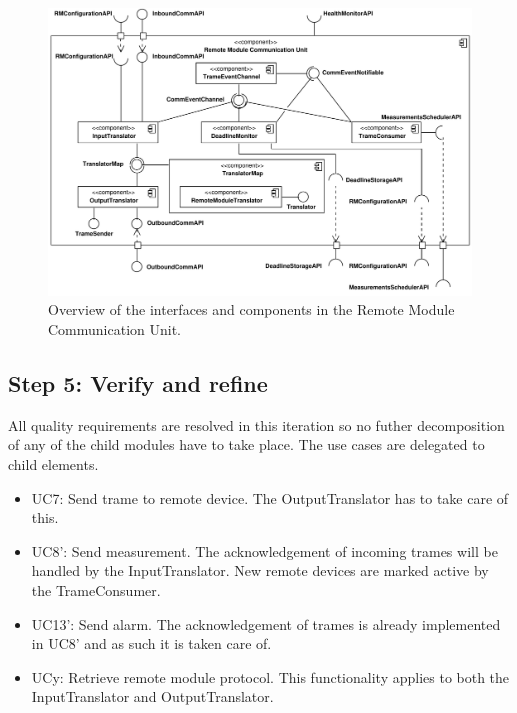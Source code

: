 \begin{figure}[H]
	\begin{centering}
		\includegraphics[width=\textwidth]{figs/add-it2-interfaces.pdf}
		\caption{Overview of the interfaces and components in the Remote
		Module Communication Unit.}
		\label{fig:it2/interfaces}
	\end{centering}
\end{figure}

\subsection{Step 5: Verify and refine}
\label{add:it2/verification}

\npar All quality requirements are resolved in this iteration so no futher
decomposition of any of the child modules have to take place. The use cases
are delegated to child elements. 

\begin{itemize}
	\item UC7: Send trame to remote device. The OutputTranslator has to take care
	of this. 
  	\item UC8': Send measurement. The acknowledgement of incoming trames will
  	be handled by the InputTranslator. New remote devices are marked active by
  	the TrameConsumer. 
  	\item UC13': Send alarm. The acknowledgement of trames is already implemented
  	in UC8' and as such it is taken care of.
  	\item UCy: Retrieve remote module protocol. This functionality applies to
  	both the InputTranslator and OutputTranslator. 
\end{itemize}
